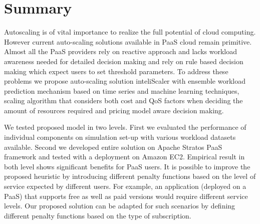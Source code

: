 \section{Summary}

Autoscaling is of vital importance to realize the full potential of cloud computing. However current auto-scaling solutions available in PaaS cloud remain primitive. Almost all the PaaS providers rely on reactive approach and lacks workload awareness needed for detailed decision making and rely on rule based decision making which expect users to set threshold parameters. To address these problems we propose auto-scaling solution inteliScaler with ensemble workload prediction mechanism based on time series and machine learning techniques, scaling algorithm that considers both cost and QoS factors when deciding the amount of resources required and pricing model aware decision making.

We tested proposed model in two levels. First we evaluated the performance of individual components on simulation set-up with various workload datasets available. Second we developed entire solution on Apache Stratos PaaS framework and tested with a deployment on Amazon EC2. Empirical result in both level shows significant benefits for PaaS users. It is possible to improve the proposed heuristic by introducing different penalty functions  based on the level of service expected by different users. For example, an application (deployed on a PaaS) that supports free as well as paid versions would require different service levels. Our proposed solution can be adapted for such scenarios by defining different penalty functions based on the type of subscription.



